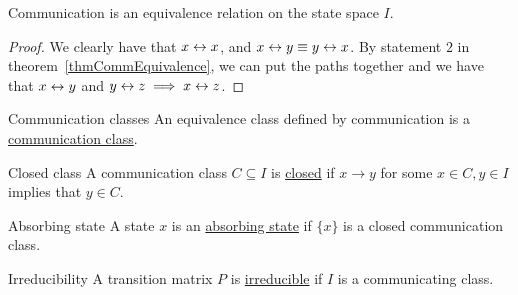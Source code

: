 \documentclass[../Main.tex]{subfiles}
\begin{document}
\begin{corollary}
    Communication is an equivalence relation on the state space $I$.
    \label{corCommEquivalence}
\end{corollary}
\begin{proof}
    We clearly have that $x \leftrightarrow x$, and $x \leftrightarrow y \equiv y \leftrightarrow x$. By statement $2$ in theorem~\ref{thmCommEquivalence}, we can put the paths together and we have that $x \leftrightarrow y$ and $y \leftrightarrow z \implies x \leftrightarrow z$.
\end{proof}
\begin{definition}{Communication classes}
    An equivalence class defined by communication is a \underline{communication class}.
\end{definition}
\begin{definition}{Closed class}
    A communication class $C \subseteq I$ is \underline{closed} if $x \to y$ for some $x \in C, y \in I$ implies that $y \in C$.
\end{definition}
\begin{definition}{Absorbing state}
    A state $x$ is an \underline{absorbing state} if $\{x\}$ is a closed communication class.
\end{definition}
\begin{definition}{Irreducibility}
    A transition matrix $P$ is \underline{irreducible} if $I$ is a communicating class.
\end{definition}
\end{document}
